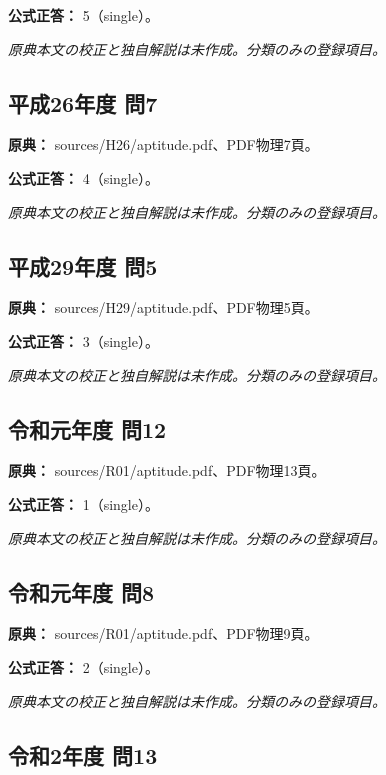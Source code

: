 \textbf{公式正答：} 5（single）。

\par\textit{原典本文の校正と独自解説は未作成。分類のみの登録項目。}

\subsection{平成26年度 問7}
\label{q:h26-reg-apt-07}

\noindent\textbf{原典：} sources/H26/aptitude.pdf、PDF物理7頁。

\textbf{公式正答：} 4（single）。

\par\textit{原典本文の校正と独自解説は未作成。分類のみの登録項目。}

\subsection{平成29年度 問5}
\label{q:h29-reg-apt-05}

\noindent\textbf{原典：} sources/H29/aptitude.pdf、PDF物理5頁。

\textbf{公式正答：} 3（single）。

\par\textit{原典本文の校正と独自解説は未作成。分類のみの登録項目。}

\subsection{令和元年度 問12}
\label{q:r01-reg-apt-12}

\noindent\textbf{原典：} sources/R01/aptitude.pdf、PDF物理13頁。

\textbf{公式正答：} 1（single）。

\par\textit{原典本文の校正と独自解説は未作成。分類のみの登録項目。}

\subsection{令和元年度 問8}
\label{q:r01-reg-apt-08}

\noindent\textbf{原典：} sources/R01/aptitude.pdf、PDF物理9頁。

\textbf{公式正答：} 2（single）。

\par\textit{原典本文の校正と独自解説は未作成。分類のみの登録項目。}

\subsection{令和2年度 問13}
\label{q:r02-reg-apt-13}

